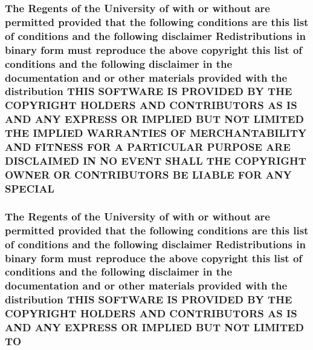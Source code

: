 \hypertarget{_l_i_c_e_n_s_e_a8f9ee001ba75f043936e238798752907}{
\subsubsection[{S\+P\+E\+C\+I\+A\+L}]{\setlength{\rightskip}{0pt plus 5cm}The Regents of the University of with or without are permitted provided that the following conditions are this list of conditions and the following disclaimer Redistributions in binary form must reproduce the above copyright this list of conditions and the following disclaimer in the documentation and or other materials provided with the distribution T\+H\+I\+S S\+O\+F\+T\+W\+A\+R\+E I\+S P\+R\+O\+V\+I\+D\+E\+D B\+Y T\+H\+E C\+O\+P\+Y\+R\+I\+G\+H\+T H\+O\+L\+D\+E\+R\+S A\+N\+D C\+O\+N\+T\+R\+I\+B\+U\+T\+O\+R\+S A\+S I\+S A\+N\+D A\+N\+Y E\+X\+P\+R\+E\+S\+S O\+R I\+M\+P\+L\+I\+E\+D B\+U\+T N\+O\+T L\+I\+M\+I\+T\+E\+D T\+H\+E I\+M\+P\+L\+I\+E\+D {\bf W\+A\+R\+R\+A\+N\+T\+I\+E\+S} O\+F M\+E\+R\+C\+H\+A\+N\+T\+A\+B\+I\+L\+I\+T\+Y A\+N\+D F\+I\+T\+N\+E\+S\+S F\+O\+R A P\+A\+R\+T\+I\+C\+U\+L\+A\+R P\+U\+R\+P\+O\+S\+E A\+R\+E D\+I\+S\+C\+L\+A\+I\+M\+E\+D I\+N N\+O E\+V\+E\+N\+T S\+H\+A\+L\+L T\+H\+E C\+O\+P\+Y\+R\+I\+G\+H\+T O\+W\+N\+E\+R O\+R C\+O\+N\+T\+R\+I\+B\+U\+T\+O\+R\+S B\+E L\+I\+A\+B\+L\+E F\+O\+R A\+N\+Y S\+P\+E\+C\+I\+A\+L}}\label{_l_i_c_e_n_s_e_a8f9ee001ba75f043936e238798752907}
\hypertarget{_l_i_c_e_n_s_e_a57f5e47bdbaa2a03fa7895d50ba5e2d3}{
\subsubsection[{T\+O}]{\setlength{\rightskip}{0pt plus 5cm}The Regents of the University of with or without are permitted provided that the following conditions are this list of conditions and the following disclaimer Redistributions in binary form must reproduce the above copyright this list of conditions and the following disclaimer in the documentation and or other materials provided with the distribution T\+H\+I\+S S\+O\+F\+T\+W\+A\+R\+E I\+S P\+R\+O\+V\+I\+D\+E\+D B\+Y T\+H\+E C\+O\+P\+Y\+R\+I\+G\+H\+T H\+O\+L\+D\+E\+R\+S A\+N\+D C\+O\+N\+T\+R\+I\+B\+U\+T\+O\+R\+S A\+S I\+S A\+N\+D A\+N\+Y E\+X\+P\+R\+E\+S\+S O\+R I\+M\+P\+L\+I\+E\+D B\+U\+T N\+O\+T L\+I\+M\+I\+T\+E\+D T\+O}}\label{_l_i_c_e_n_s_e_a57f5e47bdbaa2a03fa7895d50ba5e2d3}
